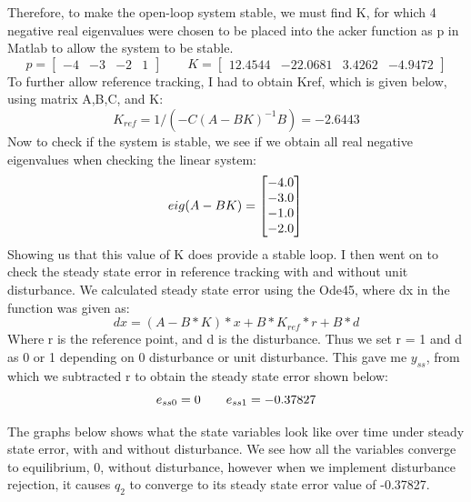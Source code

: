 \documentclass[12pt]{article}
\begin{document}
Therefore, to make the open-loop system stable, we must find K, for which 4 negative real eigenvalues were chosen to be placed into the acker function as p in Matlab to allow the system to be stable. 
\begin{equation*}
p = \begin{bmatrix}
-4 & -3 & -2 & 1
\end{bmatrix} 
\qquad K = \begin{bmatrix}
12.4544 & -22.0681 &  3.4262&   -4.9472
    \end{bmatrix}
\end{equation*}
To further allow reference tracking, I had to obtain Kref, which is given below, using matrix A,B,C, and K:
\begin{equation*}
    K_{ref} = 1/(-C{(A-BK)^{-1}}B) = -2.6443
\end{equation*}
Now to check if the system is stable, we see if we obtain all real negative eigenvalues when checking the linear system:
\begin{equation*}
    eig(A-BK) = \begin{bmatrix}
      -4.0\\ -3.0\\-1.0\\ -2.0
    \end{bmatrix}\\
\end{equation*}
Showing us that this value of K does provide a stable loop. I then went on to check the steady state error in reference tracking with and without unit disturbance. We calculated steady state error using the Ode45, where dx in the function was given as:
\begin{equation*}
    dx=(A-B*K)*x+B*K_{ref}*r+B*d
\end{equation*}
Where r is the reference point, and d is the disturbance. Thus we set r = 1 and d as 0 or 1 depending on 0 disturbance or unit disturbance. This gave me $y_{ss}$, from which we subtracted r to obtain the steady state error shown below:
\begin{equation*}
    e_{ss0} = 0 \qquad e_{ss1} = -0.37827\\
\end{equation*}

The graphs below shows what the state variables look like over time under steady state error, with and without disturbance. We see how all the variables converge to equilibrium, 0, without disturbance, however when we implement disturbance rejection, it causes $q_{2}$ to converge to its steady state error value of -0.37827.
\end{document}
